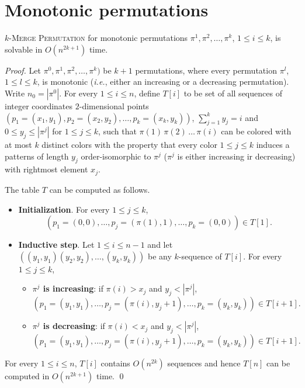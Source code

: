 \section{Monotonic permutations}
\label{section:Monotonic permutations}

\begin{proposition}
  \label{proposition:Monotonic Permutation Coloring}
  \textsc{$k$-Merge Permutation} for monotonic permutations
  $\pi^1, \pi^2, \dots, \pi^k$, $1 \leq i \leq k$, is
  solvable in $O(n^{2k+1})$ time.
\end{proposition}

\begin{proof}
  Let $\pi^0, \pi^1, \pi^2, \dots, \pi^k)$ be $k+1$ permutations, where every permutation
  $\pi^l$, $1 \leq l \leq k$, is
  monotonic (\emph{i.e.}, either an increasing or a decreasing permutation).
  Write $n_0 = |\pi^0|$.
  For every $1 \leq i \leq n$, define $T[i]$ to be set of all sequences of
  integer coordinates $2$-dimensional points
  $(p_1=(x_1, y_1), p_2=(x_2, y_2), \dots, p_k=(x_k, y_k))$,
  $\sum_{j=1}^{k} y_j = i$ and $0 \leq y_j \leq |\pi^j|$ for $1 \leq j \leq k$,
  such that
  $\pi(1) \, \pi(2) \, \dots \, \pi(i)$ can be colored with at most $k$
  distinct colors
  with the property that every color $1 \leq j \leq k$ induces a patterns of length $y_j$
  order-isomorphic to $\pi^j$ ($\pi^j$ is either increasing ir decreasing)
  with rightmost element $x_j$.

  The table $T$ can be computed as follows.
  \begin{itemize}
    \item \textbf{Initialization}.
    For every $1 \leq j \leq k$,
    $$(p_1=(0,0), \dots, p_j=(\pi(1), 1), \dots, p_k=(0,0)) \in T[1]\text{.}$$

    \item \textbf{Inductive step}.
    Let $1 \leq i \leq n-1$ and
    let $((y_1, y_1) (y_2, y_2), \dots, (y_k, y_k))$ be any $k$-sequence of
    $T[i]$.
    For every $1 \leq j \leq k$,
    \begin{itemize}
      \item \textbf{$\pi^j$ is increasing}:
      if $\pi(i) > x_j$ and $y_j < |\pi^j|$,
      $$(p_1=(y_1, y_1), \dots, p_j=(\pi(i), y_j+1), \dots, p_k=(y_k, y_k)) \in T[i+1]\text{.}$$
      \item \textbf{$\pi^j$ is decreasing}:
      if $\pi(i) < x_j$ and $y_j < |\pi^j|$,
      $$(p_1=(y_1, y_1), \dots, p_j=(\pi(i), y_j+1), \dots, p_k=(y_k, y_k)) \in T[i+1]\text{.}$$
    \end{itemize}
  \end{itemize}

  For every $1 \leq i \leq n$, $T[i]$ contains $O(n^{2k})$ sequences and hence
  $T[n]$ can be computed in $O(n^{2k+1})$ time.
  \qed
\end{proof}

